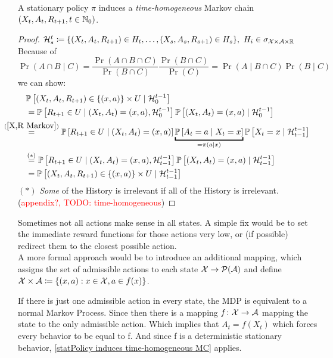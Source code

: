 \begin{remark}\label{statPolicy induces time-homogeneous MC}
	A stationary policy \(\pi\) induces a \emph{time-homogeneous} Markov chain \((X_t,A_t,R_{t+1},t\in\mathbb{N}_0)\).
\end{remark}
\begin{proof} 
	\(\mathcal{H}_s^t\coloneqq \{(X_t,A_t,R_{t+1})\in H_t,\dots,(X_s,A_s,R_{s+1})\in H_s \},\ H_i \in \sigma_{\mathcal{X}\times\mathcal{A}\times\mathbb{R}}\)
	Because of
	\[
		\Pr(A\cap B \mid C)
		=\frac{\Pr(A\cap B\cap C)}{\Pr(B\cap C)}\frac{\Pr(B\cap C)}{\Pr(C)} 
		= \Pr(A\mid B\cap C)\Pr(B\mid C) 
	\]
	we can show:
	\begin{align*}
		&\Pr\left[(X_t,A_t,R_{t+1})\in\{(x,a)\}\times U \mid \cH_0^{t-1} \right] \\
		&=\Pr\left[R_{t+1}\in U \mid (X_t, A_t)=(x,a), \cH_0^{t-1}\right]
		\Pr\left[(X_t, A_t)=(x,a)\mid\cH_0^{t-1}\right]\\
		&\lxeq{(\ref{X,R Markov})}\Pr\left[R_{t+1}\in U \mid (X_t, A_t)=(x,a)\right]
		\underbracket{\Pr\left[A_t=a \mid X_t=x\right]}_{=\pi(a\mid x)}
		\Pr\left[X_t=x\mid \cH_{t-1}^{t-1}\right]\\
		&\lxeq{(*)}\Pr\left[R_{t+1}\in U \mid (X_t, A_t)=(x,a), \cH_{t-1}^{t-1}\right]
		\Pr\left[(X_t, A_t)=(x,a)\mid\cH_{t-1}^{t-1}\right]\\
		&=\Pr\left[(X_t,A_t,R_{t+1})\in\{(x,a)\}\times U \mid \cH_{t-1}^{t-1} \right]
	\end{align*}
	\((*)\) \emph{Some} of the History is irrelevant if all of the History is irrelevant. (\textcolor{red}{appendix?, TODO: time-homogeneous})
\end{proof} 
\begin{remark} Sometimes not all actions make sense in all states. A simple fix would be to set the immediate reward functions for those actions very low, or (if possible) redirect them to the closest possible action. \\
A more formal approach would be to introduce an additional mapping, which assigns the set of admissible actions to each state \(\mathcal{X}\to\mathcal{P}(\mathcal{A})\) and define \({\mathcal{X}\times\mathcal{A}}\coloneqq\{(x,a): x\in\mathcal{X}, a\in f(x) \}\).

If there is just one admissible action in every state, the MDP is equivalent to a normal Markov Process. 
Since then there is a mapping \(f\colon\mathcal{X}\to\mathcal{A}\) mapping the state to  the only admissible action. Which implies that \(A_t=f(X_t)\) which forces every behavior to be equal to f. And since f is a deterministic stationary behavior, \ref{statPolicy induces time-homogeneous MC} applies.  
\end{remark}

